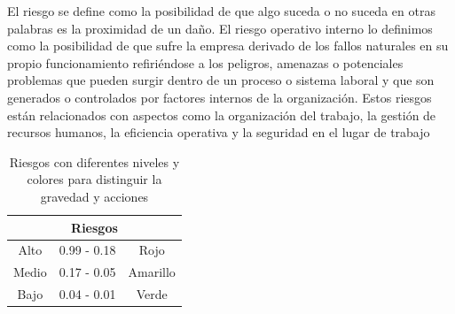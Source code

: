     El riesgo se define como la posibilidad de que algo suceda o no suceda en otras palabras es la proximidad de un daño. 
    El riesgo operativo interno lo definimos como la posibilidad de que sufre la empresa derivado de los fallos naturales en su propio funcionamiento refiriéndose a los peligros, amenazas o potenciales problemas que pueden surgir dentro de un proceso o sistema laboral y que son generados o controlados por factores internos de la organización. Estos riesgos están relacionados con aspectos como la organización del trabajo, la gestión de recursos humanos, la eficiencia operativa y la seguridad en el lugar de trabajo
    \begin{table}[h]
        \centering
        \caption{Riesgos con diferentes niveles y colores para distinguir la gravedad y acciones}
        \begin{tabular}{c c c}
        \hline
        \multicolumn{3}{c}{Riesgos}\\
        \hline
             Alto& 0.99 - 0.18 & Rojo  \\
        \hline
             Medio& 0.17 - 0.05 & Amarillo  \\
        \hline
             Bajo& 0.04 - 0.01 & Verde \\
        \hline     
        \end{tabular}
        \label{tab:riego}
    \end{table}
